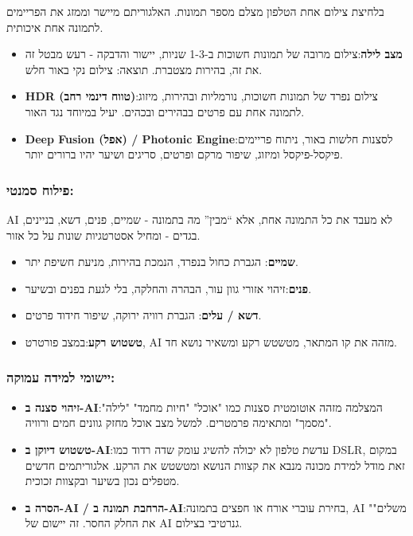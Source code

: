 בלחיצת צילום אחת הטלפון מצלם מספר תמונות. האלגוריתם מיישר וממזג את הפריימים לתמונה אחת איכותית.

\begin{itemize}
  \item \textbf{מצב לילה}:צילום מרובה של תמונות חשוכות ב-1-3 שניות, יישור והדבקה - רעש מבטל זה את זה, בהירות מצטברת. תוצאה: צילום נקי באור חלש.
  \item \textbf{HDR (טווח דינמי רחב)}:צילום נפרד של תמונות חשוכות, נורמליות ובהירות, מיזוג לתמונה אחת עם פרטים בבהירים ובכהים. יעיל במיוחד נגד האור.
  \item \textbf{Deep Fusion (אפל) / Photonic Engine}:לסצנות חלשות באור, ניתוח פריימים פיקסל-פיקסל ומיזוג, שיפור מרקם ופרטים, סריגים ושיער יהיו ברורים יותר.
\end{itemize}

\subsubsection*{פילוח סמנטי:}

AI לא מעבד את כל התמונה אחת, אלא “מבין” מה בתמונה - שמיים, פנים, דשא, בניינים, בגדים - ומחיל אסטרטגיות שונות על כל אזור.

\begin{itemize}
  \item \textbf{שמיים}: הגברת כחול בנפרד, הנמכת בהירות, מניעת חשיפת יתר.
  \item \textbf{פנים}:זיהוי אזורי גוון עור, הבהרה והחלקה, בלי לגעת בפנים ובשיער.
  \item \textbf{דשא / עלים}: הגברת רוויה ירוקה, שיפור חידוד פרטים.
  \item \textbf{טשטוש רקע}:במצב פורטרט, AI מזהה את קו המתאר, מטשטש רקע ומשאיר נושא חד.
\end{itemize}

\subsubsection*{יישומי למידה עמוקה:}

\begin{itemize}
  \item \textbf{זיהוי סצנה ב-AI}:המצלמה מזהה אוטומטית סצנות כמו "אוכל" "חיות מחמד" "לילה" "מסמך" ומתאימה פרמטרים. למשל מצב אוכל מחזק גוונים חמים ורוויה.
  \item \textbf{טשטוש דיוקן ב-AI}:עדשת טלפון לא יכולה להשיג עומק שדה רדוד כמו DSLR, במקום זאת מודל למידת מכונה מנבא את קצוות הנושא ומטשטש את הרקע. אלגוריתמים חדשים מטפלים נכון בשיער ובקצוות זכוכית.
  \item \textbf{הסרה ב-AI / הרחבת תמונה ב-AI}:בחירת עוברי אורח או חפצים בתמונה, AI "משלים" את החלק החסר. זה יישום של AI גנרטיבי בצילום.
\end{itemize}

